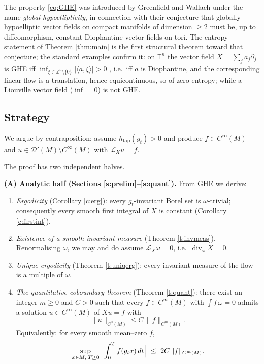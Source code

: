 \documentclass[11pt]{amsart}
\theoremstyle{plain}
\theoremstyle{definition}
\theoremstyle{remark}
\newcommand{\DD}{\mathcal{D}'}
\newcommand{\flow}{g_t}
\newcommand{\Lie}{\mathcal{L}}
\begin{document}
The property \eqref{eq:GHE} was introduced by Greenfield and
Wallach \cite{GW} under the name \emph{global hypoellipticity}, in
connection with their conjecture that globally hypoelliptic vector
fields on compact manifolds of dimension $\ge 2$ must be, up to
diffeomorphism, constant Diophantine vector fields on tori.  The
entropy statement of Theorem \ref{thm:main} is the first structural
theorem toward that conjecture; the standard examples confirm it:
on $\mathbb{T}^n$ the vector field $X=\sum_j a_j\partial_{j}$ is GHE
iff $\inf_{\xi\in\mathbb{Z}^n\setminus\{0\}}|\langle
a,\xi\rangle|>0$ \cite{GW}, i.e.\ iff $a$ is Diophantine, and the
corresponding linear flow is a translation, hence equicontinuous, so
of zero entropy; while a Liouville vector field ($\inf=0$) is not GHE.

\subsection{Strategy}

We argue by contraposition: assume $h_{\mathrm{top}}(\flow)>0$ and
produce $f\in C^\infty(M)$ and $u\in \DD(M)\setminus C^\infty(M)$ with
$\Lie_X u=f$.

The proof has two independent halves.

\medskip
\noindent\textbf{(A) Analytic half (Sections
\ref{s:prelim}--\ref{s:quant}).}  From GHE we derive:
\begin{enumerate}
\item[(A1)] \emph{Ergodicity} (Corollary \ref{c:erg}): every
$\flow$-invariant Borel set is $\omega$-trivial; consequently every
smooth first integral of $X$ is constant (Corollary \ref{c:firstint}).
\item[(A2)] \emph{Existence of a smooth invariant measure}
(Theorem \ref{t:invmeas}).  Renormalising $\omega$, we may and do
assume $\Lie_X\omega=0$, i.e.\ $\operatorname{div}_\omega X=0$.
\item[(A3)] \emph{Unique ergodicity} (Theorem \ref{t:uniqerg}): every
invariant measure of the flow is a multiple of $\omega$.
\item[(A4)] \emph{The quantitative coboundary theorem}
(Theorem \ref{t:quant}): there exist an integer $m\ge 0$ and $C>0$
such that every $f\in C^\infty(M)$ with $\int f\,\omega=0$ admits a
solution $u\in C^\infty(M)$ of $Xu=f$ with
\begin{equation}\label{eq:UB intro}
\|u\|_{C^0(M)}\le C\,\|f\|_{C^{m}(M)} .
\end{equation}
Equivalently: for every smooth mean--zero $f$,
\[
\sup_{x\in M,\;T\ge 0}\ \Bigl|\int_0^{T} f(g_t x)\,dt\Bigr|
\ \le\ 2C\,\|f\|_{C^{m}(M)} .
\]
\end{enumerate}
\end{document}
